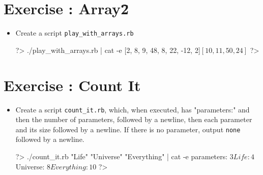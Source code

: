 \documentclass{42-en}
\begin{document}


\chapter{Exercise \exercicenumber: Array\+\=2}

\exnumber{\exercicenumber}

\makeheaderfiles

\begin{itemize}

\item Create a script \texttt{play_with_arrays.rb} 

\begin{42console}
	?> ./play_with_arrays.rb | cat -e
	[2, 8, 9, 48, 8, 22, -12, 2]$
	[10, 11, 50, 24]$
	?>
\end{42console}

\end{itemize}



\chapter{Exercise \exercicenumber: Count It}

\exnumber{\exercicenumber}

\makeheaderfiles

\begin{itemize}

\item Create a script \texttt{count_it.rb}, which, when executed, has "parameters:" and then the number of parameters, followed by a newline, then each parameter and its size followed by a newline. If there is no parameter, output \texttt{none} followed by a newline. 

\begin{42console}
	?> ./count_it.rb "Life" "Universe" "Everything" | cat -e
	parameters: 3$
	Life: 4$
	Universe: 8$
	Everything: 10$
	?>
\end{42console}

\end{itemize}
\end{document}
